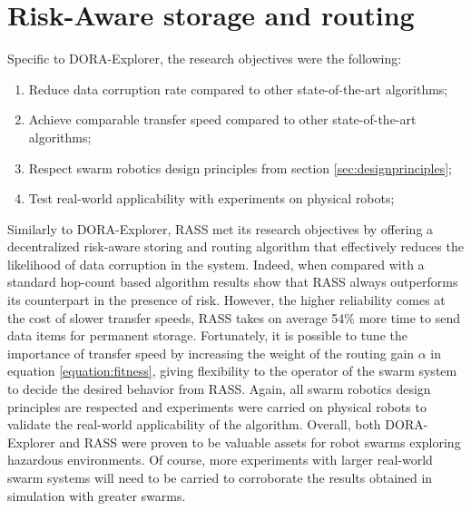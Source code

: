 \section{Risk-Aware storage and routing}
Specific to DORA-Explorer, the research objectives were the following:

\begin{enumerate}
    \item Reduce data corruption rate compared to other state-of-the-art algorithms;
    \item Achieve comparable transfer speed compared to other state-of-the-art algorithms;
    \item Respect swarm robotics design principles from section \ref{sec:designprinciples};
    \item Test real-world applicability with experiments on physical robots;
\end{enumerate}

Similarly to DORA-Explorer, RASS met its research objectives by offering a decentralized risk-aware storing and routing algorithm that effectively reduces the likelihood of data corruption in the system. Indeed, when compared with a standard hop-count based algorithm results show that RASS always outperforms its counterpart in the presence of risk. However, the higher reliability comes at the cost of slower transfer speeds, RASS takes on average 54\% more time to send data items for permanent storage. Fortunately, it is possible to tune the importance of transfer speed by increasing the weight of the routing gain $\alpha$ in equation \ref{equation:fitness}, giving flexibility to the operator of the swarm system to decide the desired behavior from RASS. Again, all swarm robotics design principles are respected and experiments were carried on physical robots to validate the real-world applicability of the algorithm. Overall, both DORA-Explorer and RASS were proven to be valuable assets for robot swarms exploring hazardous environments. Of course, more experiments with larger real-world swarm systems will need to be carried to corroborate the results obtained in simulation with greater swarms.
 